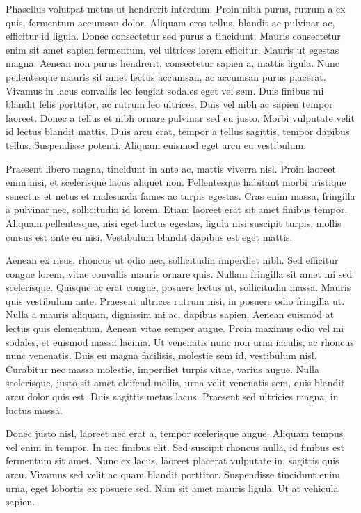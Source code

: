 Phasellus volutpat metus ut hendrerit interdum. Proin nibh purus, rutrum a ex quis, fermentum accumsan dolor. Aliquam eros tellus, blandit ac pulvinar ac, efficitur id ligula. Donec consectetur sed purus a tincidunt. Mauris consectetur enim sit amet sapien fermentum, vel ultrices lorem efficitur. Mauris ut egestas magna. Aenean non purus hendrerit, consectetur sapien a, mattis ligula. Nunc pellentesque mauris sit amet lectus accumsan, ac accumsan purus placerat. Vivamus in lacus convallis leo feugiat sodales eget vel sem. Duis finibus mi blandit felis porttitor, ac rutrum leo ultrices. Duis vel nibh ac sapien tempor laoreet. Donec a tellus et nibh ornare pulvinar sed eu justo. Morbi vulputate velit id lectus blandit mattis. Duis arcu erat, tempor a tellus sagittis, tempor dapibus tellus. Suspendisse potenti. Aliquam euismod eget arcu eu vestibulum.

Praesent libero magna, tincidunt in ante ac, mattis viverra nisl. Proin laoreet enim nisi, et scelerisque lacus aliquet non. Pellentesque habitant morbi tristique senectus et netus et malesuada fames ac turpis egestas. Cras enim massa, fringilla a pulvinar nec, sollicitudin id lorem. Etiam laoreet erat sit amet finibus tempor. Aliquam pellentesque, nisi eget luctus egestas, ligula nisi suscipit turpis, mollis cursus est ante eu nisi. Vestibulum blandit dapibus est eget mattis.

Aenean ex risus, rhoncus ut odio nec, sollicitudin imperdiet nibh. Sed efficitur congue lorem, vitae convallis mauris ornare quis. Nullam fringilla sit amet mi sed scelerisque. Quisque ac erat congue, posuere lectus ut, sollicitudin massa. Mauris quis vestibulum ante. Praesent ultrices rutrum nisi, in posuere odio fringilla ut. Nulla a mauris aliquam, dignissim mi ac, dapibus sapien. Aenean euismod at lectus quis elementum. Aenean vitae semper augue. Proin maximus odio vel mi sodales, et euismod massa lacinia. Ut venenatis nunc non urna iaculis, ac rhoncus nunc venenatis. Duis eu magna facilisis, molestie sem id, vestibulum nisl. Curabitur nec massa molestie, imperdiet turpis vitae, varius augue. Nulla scelerisque, justo sit amet eleifend mollis, urna velit venenatis sem, quis blandit arcu dolor quis est. Duis sagittis metus lacus. Praesent sed ultricies magna, in luctus massa.

Donec justo nisl, laoreet nec erat a, tempor scelerisque augue. Aliquam tempus vel enim in tempor. In nec finibus elit. Sed suscipit rhoncus nulla, id finibus est fermentum sit amet. Nunc ex lacus, laoreet placerat vulputate in, sagittis quis arcu. Vivamus sed velit ac quam blandit porttitor. Suspendisse tincidunt enim urna, eget lobortis ex posuere sed. Nam sit amet mauris ligula. Ut at vehicula sapien.

